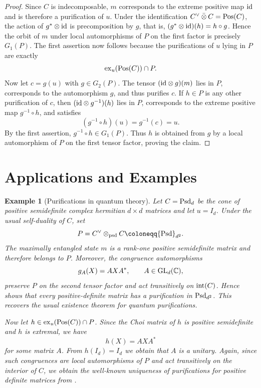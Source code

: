 \documentclass[11pt]{article}
\newcommand{\barabove}[1]{\hspace{2pt}\bar{#1}\hspace{2pt}}
\theoremstyle{result}
\theoremstyle{discussion}
\newtheorem{example}[example]{Example}
\newcommand{\omax}{\barabove{\otimes}}
\begin{document}
\begin{proof}
    Since $C$ is indecomposable, $m$ corresponds to the extreme positive map
    ${\rm id}$ and is therefore a purification of $u$. Under the
    identification $C^\vee\omax C={\rm Pos}(C)$, the action of
    $g^*\otimes{\rm id}$ is precomposition by $g$, that is,
    $(g^*\otimes{\rm id})(h)=h\circ g$. Hence the orbit of $m$
    under local automorphisms of $P$ on the first factor is precisely
    $G_1(P)$. The first assertion now follows because the purifications of
    $u$ lying in $P$ are exactly
    \[
        {\rm ex}_u({\rm Pos}(C))\cap P.
    \]
    Now let $c=g(u)$ with $g\in G_2(P)$. The tensor
    $({\rm id}\otimes g)(m)$ lies in $P$, corresponds to the automorphism
    $g$, and thus purifies $c$. If $h\in P$
    is any other purification of $c$, then
    $({\rm id}\otimes g^{-1})(h)$ lies in $P$, corresponds to the extreme
    positive map $g^{-1}\circ h$, and satisfies
    \[
        (g^{-1}\circ h)(u)=g^{-1}(c)=u.
    \]
    By the first assertion, $g^{-1}\circ h\in G_1(P)$. Thus $h$ is obtained from
    $g$ by a local automorphism of $P$ on the first tensor factor, proving
    the claim.
\end{proof}

\section{Applications and Examples}

\begin{example}[Purifications in quantum theory]
\label{ex:qupuri}
    Let $C={\rm Psd}_d$ be the cone of positive semidefinite complex hermitian
    $d\times d$ matrices and let $u=I_d$. Under the usual self-duality of $C$, set
    \[
        P=C^\vee\otimes_{\rm psd}C\coloneqq {\rm Psd}_{d^2}.
    \]
    The maximally entangled state $m$ is a rank-one positive semidefinite
    matrix and therefore belongs to $P$. Moreover, the congruence
    automorphisms
    \[
        g_A(X)=AXA^*,\qquad A\in{\rm GL}_d(\mathbb C),
    \]
    preserve $P$ on the second tensor factor and act transitively on
    ${\rm int}(C)$. Hence  shows that every positive-definite
    matrix has a purification in ${\rm Psd}_{d^2}$. This recovers the usual
    existence theorem for quantum purifications.

    Now let $h\in{\rm ex}_u({\rm Pos}(C))\cap P$. Since the Choi matrix of $h$ is positive
    semidefinite and $h$ is extremal, we have 
    \[
        h(X)=AXA^*
    \]
    for some matrix $A$. From  $h(I_d)=I_d$ we obtain that $A$ is a unitary. Again, since such congruences are local automorphisms of $P$ and act transitively on the interior of $C$, we obtain the well-known uniqueness of purifications for positive definite matrices from .
\end{example}
\end{document}
